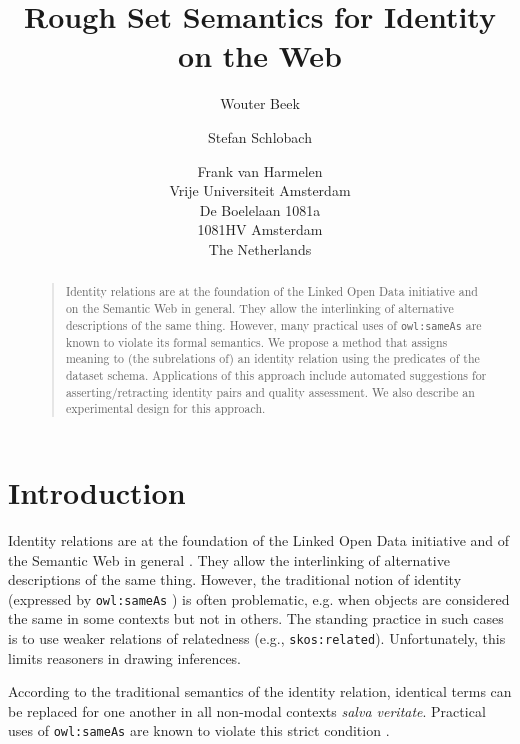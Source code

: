 \documentclass[letterpaper]{article}
\begin{document}
\title{Rough Set Semantics for Identity on the Web}
\author{Wouter Beek \and Stefan Schlobach \and Frank van Harmelen\\
Vrije Universiteit Amsterdam\\
De Boelelaan 1081a\\
1081HV Amsterdam\\
The Netherlands}
\maketitle
\begin{abstract}
\begin{quote}
Identity relations are at the foundation of the Linked Open Data initiative
  and on the Semantic Web in general.
They allow the interlinking of alternative descriptions of the same thing.
However, many practical uses of \verb|owl:sameAs| are known to violate its
  formal semantics.
We propose a method that assigns meaning to (the subrelations of)
  an identity relation using the predicates of the dataset schema.
Applications of this approach include automated suggestions for
  asserting/retracting identity pairs and quality assessment.
We also describe an experimental design for this approach.
\end{quote}
\end{abstract}

\section{Introduction}
\label{sec:introduction}

Identity relations are at the foundation of the Linked Open Data initiative
  and of the Semantic Web in general \cite{bizer_cyganiak_heath_2007}.
They allow the interlinking of alternative descriptions of the same thing.
However, the traditional notion of identity
  (expressed by \verb|owl:sameAs| \cite{motic_paterschneider_grau_2012})
  is often problematic, e.g. when objects are considered the same in some
  contexts but not in others.
The standing practice in such cases is to use weaker relations of relatedness
  (e.g., \verb|skos:related|).
Unfortunately, this limits reasoners in drawing inferences.

According to the traditional semantics of the identity relation,
  identical terms can be replaced for one another in all non-modal contexts
  \emph{salva veritate}.
Practical uses of \verb|owl:sameAs| are known to violate this strict condition
  \cite{halpin_hayes_2010,halpin_hayes_mccusker_mcguinness_thompson_2010}.
\end{document}
